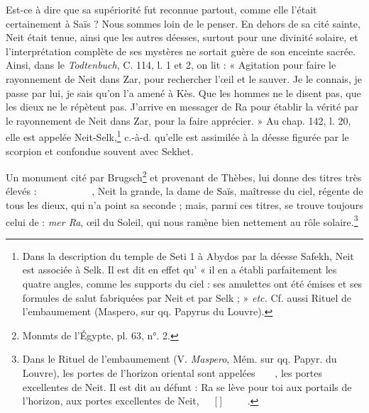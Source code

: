 \documentclass[letterpaper,twocolumn,openany,nodeprecatedcode]{dndbook}
\newcommand*\hieroAAAG{}
\newcommand*\hieroAAAH{}
\newcommand*\hieroAAAI{}
\newcommand*\hieroAAAM{}
\newcommand*\hieroAAAW{\raisebox{0.5ex}{}}
\newcommand*\hieroAABC{\raisebox{0.5ex}{}}
\newcommand*\hieroAABR{}
\newcommand*\hieroAACM{}
\newcommand*\hieroAACV{}
\newcommand*\hieroAADB{}
\newcommand*\hieroAADC{\raisebox{0.5ex}{}}
\newcommand*\hieroAAEF{}
\newcommand*\hieroAAEK{}
\newcommand*\hieroAAEX{}
\newcommand*\hieroAAEY{}
\newcommand*\hieroAAEZ{}
\newcommand*\hieroAAFD{}
\newcommand*\hieroAAFS{}
\newcommand*\hieroAAKG{}
\newcommand*\hieroAAMR{\raisebox{0.5ex}{}}
\newcommand*\hieroAAND{\raisebox{0.5ex}{}}
\newcommand*\hieroAANT{\raisebox{0.5ex}{}}
\newcommand*\hieroAANX{\raisebox{0.8ex}{}}
\newcommand*\hieroAAOK{}
\newcommand*\hieroAAPH{}
\newcommand*\hieroAARU{}
\newcommand*\hieroAATG{}
\newcommand*\hieroAAVG{}
\newcommand*\hieroAAWJ{}
\newcommand*\hieroAAYZ{}
\newcommand*\hieroAAZC{}
\newcommand*\hieroAAZD{}
\newcommand*\hieroAAZE{}
\newcommand*\hieroAAZF{}
\newcommand*\hieroAAZG{}
\newcommand*\hieroAAZH{}
\begin{document}
Est-ce à dire que sa supériorité fut reconnue partout, comme elle l'était certainement à Saïs ? Nous sommes loin de le penser. En dehors de sa cité sainte, Neit était tenue, ainsi que les autres déesses, surtout pour une divinité solaire, et l'interprétation complète de ses mystères ne sortait guère de son enceinte sacrée. Ainsi, dans le \emph{Todtenbuch}, C. 114, l. 1 et 2, on lit : « Agitation pour faire le rayonnement de Neit dans Zar, pour rechercher l'œil et le sauver. Je le connais, je passe par lui, je sais qu'on l’a amené à Kès. Que les hommes ne le disent pas, que les dieux ne le répètent pas. J'arrive en messager de Ra pour établir la vérité par le rayonnement de Neit dans Zar, pour la faire apprécier. » Au chap. 142, l. 20, elle est appelée Neit-Selk,\footnote{Dans la description du temple de Seti 1 à Abydos par la déesse Safekh, Neit est associée à Selk. Il est dit en effet qu' « il en a établi parfaitement les quatre angles, comme les supports du ciel : ses amulettes ont été émises et ses formules de salut fabriquées par Neit et par Selk ; » \emph{etc.} Cf. aussi Rituel de l'embaumement (Maspero, sur qq. Papyrus du Louvre).} c.-à-d. qu'elle est assimilée à la déesse figurée par le scorpion et confondue souvent avec Sekhet.

Un monument cité par Brugsch\footnote{Monmts de l'Égypte, pl. 63, n°. 2.} et provenant de Thèbes, lui donne des titres très élevés : $\hieroAACV\:\hieroAARU\:\hieroAAFS\allowbreak\:\hieroAANX\:\hieroAAAI\:\hieroAAAG\:\hieroAAAH\:\hieroAAAH\:\hieroAAAW\allowbreak\:\hieroAAFS\:\hieroAAPH\:\hieroAAEZ\:\hieroAAWJ\:\hieroAAEK\:\hieroAAEK\allowbreak\:\hieroAAEK\:\hieroAAEF\:\hieroAABC\:\hieroAACM\:\hieroAAEF\:\hieroAAMR\allowbreak\:\hieroAAND\:\hieroAAYZ\:\hieroAAAM$, Neit la grande, la dame de Saïs, maîtresse du ciel, régente de tous les dieux, qui n'a point sa seconde ; mais, parmi ces titres, se trouve toujours celui de : \emph{mer Ra}, œil du Soleil, qui nous ramène bien nettement au rôle solaire.\footnote{Dans le Rituel de l'embaumement (V. \emph{Maspero}, Mém. sur qq. Papyr. du Louvre), les portes de l'horizon oriental sont appelées $\hieroAANT\:\hieroAAAG\:\hieroAADC\allowbreak\:\hieroAAZC\:\hieroAAZD\:\hieroAABR\allowbreak\:\hieroAAEX\:\hieroAATG$, les portes excellentes de Neit. Il est dit au défunt : Ra se lève pour toi aux portails de l'horizon, aux portes excellentes de Neit, $\hieroAADC\:\hieroAAFD\:\hieroAAZE\allowbreak\:\hieroAADB\:\hieroAAOK\:\hieroAADB$[$\hieroAAVG\:\hieroAABR$]$\hieroAAZF\:\hieroAAKG\:\hieroAAZG\allowbreak\:\hieroAADB\:\hieroAABR\:\hieroAANT\allowbreak\:\hieroAAZH\:\hieroAAZC\:\hieroAAZD\allowbreak\:\hieroAABR\:\hieroAAEX\:\hieroAAEY$.}
\end{document}
